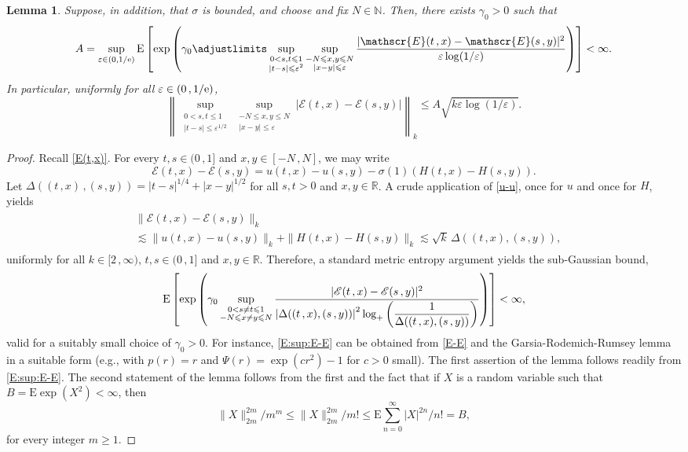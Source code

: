 \documentclass[reqno]{amsart}
\newcommand{\<}{\langle}
\renewcommand{\>}{\rangle}
\newcommand{\N}{\mathbb{N}}
\newcommand{\R}{\mathbb{R}}
\newcommand{\E}{\mathrm{E}}
\newcommand{\1}{\mathbb{1}}
\newcommand{\e}{{\rm e}}
\renewcommand{\ge}{\geqslant}
\renewcommand{\le}{\leqslant}
\newtheorem{lemma}[stat]{Lemma}
\theoremstyle{definition}
\numberwithin{equation}{section}
\begin{document}
\begin{lemma}\label{lem:E:exp:E}
	Suppose, in addition, that $\sigma$ is bounded, and choose
	and fix $N\in\N$. Then, there exists $\gamma_0>0$ such that
	\begin{align*}
		A= \sup_{\varepsilon\in(0,1/\e)}\E\left[ \exp\left( \gamma_0 \adjustlimits
		\sup_{\substack{ 0<s, t \le 1\\|t-s| \le\varepsilon^2}}
		\sup_{\substack{ -N\le x, y\le N\\|x-y|\le\varepsilon}}
		\frac{|\mathscr{E}(t\,,x) - \mathscr{E}(s\,,y)|^2}{%
		\varepsilon\log(1/\varepsilon)}
		\right) \right] < \infty.
	\end{align*}
	In particular, uniformly for all $\varepsilon\in(0\,,1/\e)$,
	\[
		\left\| \sup_{\substack{ 0<s, t \le 1\\|t-s| \le\varepsilon^{1/2}}}
		\sup_{\substack{ -N\le x, y\le N\\|x-y|\le\varepsilon}}
		|\mathscr{E}(t\,,x) - \mathscr{E}(s\,,y)|\right\|_k
		\le A \sqrt{k\varepsilon\log(1/\varepsilon)}.
	\]
\end{lemma}

\begin{proof}
	Recall \eqref{E(t,x)}.
	For every $t,s \in (0\,,1]$ and $x, y \in [-N\,,N]$, we may write
	\[
		\mathscr{E}(t\,,x)-\mathscr{E}(s\,,y) = u(t\,,x)-u(s\,,y) - \sigma(1)(H(t\,,x)-H(s\,,y)).
	\]
	Let $\Delta((t\,,x)\,,(s\,,y)) = |t-s|^{1/4} + |x-y|^{1/2}$ for all $s,t>0$
	and $x,y\in\R$.
	A crude application of \eqref{u-u}, once for $u$ and once for $H$, yields
	\begin{align}\begin{split}\label{E-E}
		&\|\mathscr{E}(t\,,x)-\mathscr{E}(s\,,y)\|_k \\
		&\lesssim 
			\|u(t\,,x)-u(s\,,y)\|_k + \|H(t\,,x)-H(s\,,y)\|_k
		\lesssim\sqrt{k}\,\Delta((t\,,x),(s\,,y)),
	\end{split}\end{align}
	uniformly for all $k \in [2\,,\infty)$, $t,s \in (0\,,1]$ and $x, y \in\R$. 
	Therefore, a standard metric entropy argument yields the sub-Gaussian 
	bound,
	\begin{align}\label{E:sup:E-E}
		\E\left[ \exp\left( \gamma_0 
		\sup_{\substack{ 0<s\neq t \le 1\\-N\le x\neq y\le N}}
		\frac{|\mathscr{E}(t\,,x) - \mathscr{E}(s\,,y)|^2}{%
		\left| \Delta ((t\,,x),(s\,,y))\right|^2
		\log_+\left(\dfrac{1}{\Delta((t\,,x),(s\,,y))} \right) } 
		\right) \right] < \infty,
	\end{align}
	valid for a suitably small choice of $\gamma_0>0$.
	For instance, \eqref{E:sup:E-E} can be obtained from \eqref{E-E} and 
	the Garsia-Rodemich-Rumsey lemma \cite{GRR} in a suitable form 
	(e.g., \cite[Proposition A.1]{DKN07} with $p(r)=r$ and 
	$\Psi(r) = \exp(c r^2)-1$ for $c>0$ small).
	The first assertion of the lemma follows readily from \eqref{E:sup:E-E}.	
	The second statement of
	the lemma follows from the first and the fact that if $X$ is a random
	variable such that $B=\E\exp(X^2)<\infty$, then
	\[\textstyle
		\| X\|_{2m}^{2m}/m^m \le
		\| X\|_{2m}^{2m}/m! \le \E\sum_{n=0}^\infty
		|X|^{2n}/n! = B,
	\]
	for every integer $m\ge1$.
\end{proof}
\end{document}
